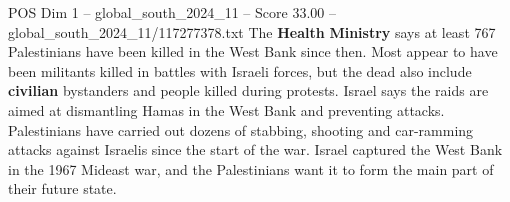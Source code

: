 \begin{textsample}{POS Dim 1 – global\_south\_2024\_11 – Score 33.00 – global\_south\_2024\_11/117277378.txt}
The \textbf{Health} \textbf{Ministry} says at least 767 Palestinians have been killed in the West Bank since then.
Most appear to have been militants killed in battles with Israeli forces, but the dead also include \textbf{civilian} bystanders and people killed during protests.
Israel says the raids are aimed at dismantling Hamas in the West Bank and preventing attacks.
Palestinians have carried out dozens of stabbing, shooting and car-ramming attacks against Israelis since the start of the war.
Israel captured the West Bank in the 1967 Mideast war, and the Palestinians want it to form the main part of their future state.

\end{textsample}
